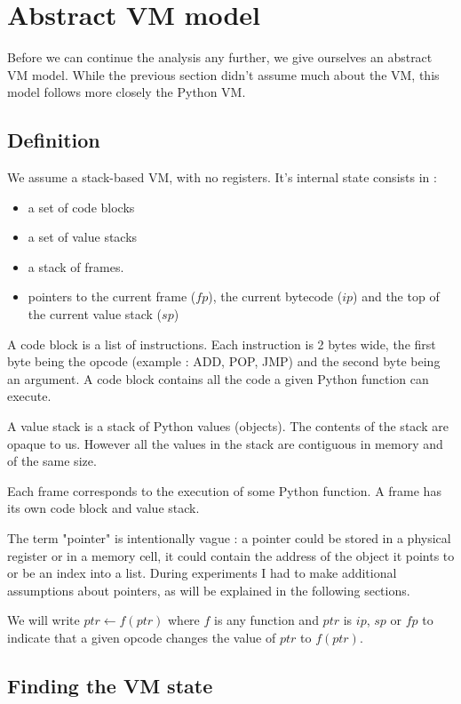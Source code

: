 \documentclass[english]{article}
\begin{document}
\section{Abstract VM model}

Before we can continue the analysis any further, we give ourselves an abstract VM model. While the previous section didn't assume much about the VM, this model follows more closely the Python VM.
\subsection{Definition}

We assume a stack-based VM, with no registers. It's internal state consists in :
\begin{itemize}
	\item a set of code blocks 
	\item a set of value stacks 
	\item a stack of frames.  
	\item pointers to the current frame ($fp$), the current bytecode ($ip$) and the top of the current value stack ($sp$)
\end{itemize}

A code block is a list of instructions. Each instruction is 2 bytes wide, the first byte being the opcode (example : ADD, POP, JMP) and the second byte being an argument. A code block contains all the code a given Python function can execute.

A value stack is a stack of Python values (objects). The contents of the stack are opaque to us. However all the values in the stack are contiguous in memory and of the same size.

Each frame corresponds to the execution of some Python function. A frame has its own code block and value stack.

The term "pointer" is intentionally vague : a pointer could be stored in a physical register or in a memory cell, it could contain the address of the object it points to or be an index into a list. During experiments I had to make additional assumptions about pointers, as will be explained in the following sections.

We will write $ptr \leftarrow f(ptr)$ where $f$ is any function and $ptr$ is $ip$, $sp$ or $fp$ to indicate that a given opcode changes the value of $ptr$ to $f(ptr)$.

\subsection{Finding the VM state}
\end{document}
